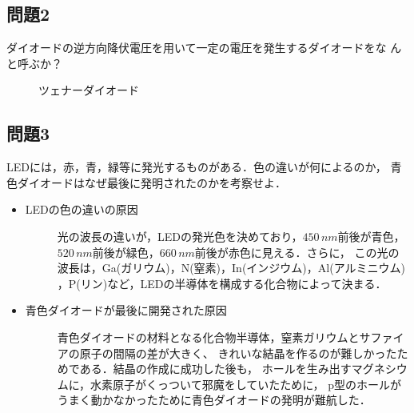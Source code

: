 \subsection*{問題2}
ダイオードの逆方向降伏電圧を用いて一定の電圧を発生するダイオードをな
んと呼ぶか？
\begin{description}
    \item[] ツェナーダイオード
\end{description}

\newpage

\subsection*{問題3}
LEDには，赤，青，緑等に発光するものがある．色の違いが何によるのか，
青色ダイオードはなぜ最後に発明されたのかを考察せよ．
\begin{itemize}
    \item LEDの色の違いの原因
    \begin{description}
        \item[] 光の波長の違いが，LEDの発光色を決めており，$450\,\si{nm}$前後が青色，
        $520\,\si{nm}$前後が緑色，$660\,\si{nm}$前後が赤色に見える．さらに，
        この光の波長は，Ga(ガリウム)，N(窒素)，In(インジウム)，Al(アルミニウム)
        ，P(リン)など，LEDの半導体を構成する化合物によって決まる．

    \end{description}
    \item 青色ダイオードが最後に開発された原因
    \begin{description}
        \item[] 青色ダイオードの材料となる化合物半導体，窒素ガリウムとサファイアの原子の間隔の差が大きく、
        きれいな結晶を作るのが難しかったためである．結晶の作成に成功した後も，
        ホールを生み出すマグネシウムに，水素原子がくっついて邪魔をしていたために，
        p型のホールがうまく動かなかったために青色ダイオードの発明が難航した．
    \end{description}
\end{itemize}
